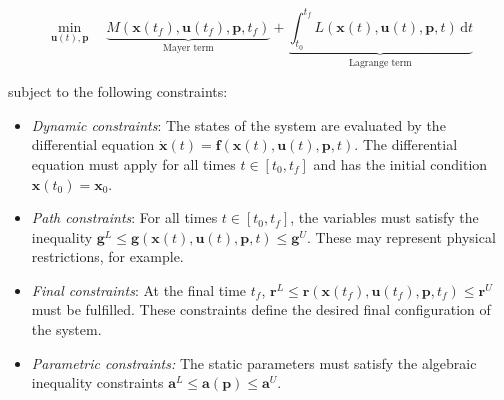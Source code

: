 \documentclass[12pt]{article}
\newcommand{\dd}{\mathrm{d}}
\renewcommand{\v}{\bm}
\begin{document}
\begin{equation*}
	\min_{\v{u}(t), \v{p}} \quad \underbrace{M(\v{x}(t_f), \v{u}(t_f),
		\v{p}, t_f)}_{\text{Mayer term}} + \underbrace{\int_{t_0}^{t_f} L(\v{x}(t),
		\v{u}(t), \v{p}, t)\, \dd t}_{\text{Lagrange term}}
\end{equation*}

subject to the following constraints:

\begin{itemize}
	\item \textit{Dynamic constraints}:
	      The states of the system are evaluated by the differential equation
	      $\dot{\v{x}}(t) = \v{f}(\v{x}(t), \v{u}(t), \v{p}, t)$. The differential
	      equation must apply for all times $t \in [t_0, t_f]$ and has the initial
	      condition $\v{x}(t_0) = \v{x}_0$.

	\item \textit{Path constraints}:
	      For all times $t \in [t_0, t_f]$, the variables must satisfy the
	      inequality $\v{g}^L \leq \v{g}(\v{x}(t), \v{u}(t), \v{p}, t) \leq \v{g}^U$.
	      These may represent physical restrictions, for example.

	\item \textit{Final constraints}:
	      At the final time $t_f$, $\v{r}^L \leq \v{r}(\v{x}(t_f), \v{u}(t_f),
		      \v{p}, t_f) \leq \v{r}^U$ must be fulfilled. These constraints define the
	      desired final configuration of the system.

	\item \textit{Parametric constraints:}
	      The static parameters must satisfy the algebraic inequality constraints
	      $\v{a}^L \leq \v{a}(\v{p}) \leq \v{a}^U$.
\end{itemize}
\end{document}
